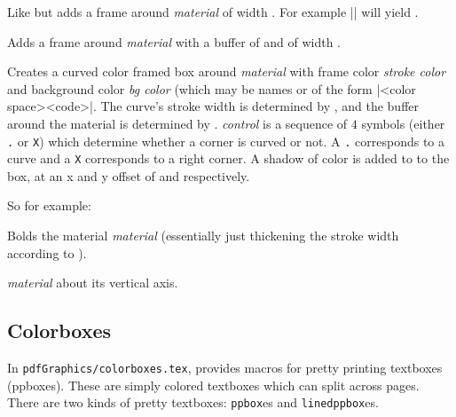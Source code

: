 Like \gotomacro{} but adds a frame around {\it material} of width \macro\framewidth.
For example \inlinecode|| will yield .
\emacroexp

Adds a frame around {\it material} with a buffer of \macro\bufferwidth{} and \macro\bufferheight{} of width \macro\framewidth.
\emacroexp

Creates a curved color framed box around {\it material} with frame color {\it stroke color} and background color {\it bg color} (which may be names or of the form \inlinecode|<color space>{<code>}|.
The curve's stroke width is determined by \macro\curvewidth, and the buffer around the material is determined by \macro\curvebuffer.
{\it control} is a sequence of $4$ symbols (either {\tt .} or {\tt X}) which determine whether a corner is curved or not.
A {\tt .} corresponds to a curve and a {\tt X} corresponds to a right corner.
A shadow of color \macro\boxshadowcolor{} is added to to the box, at an x and y offset of \macro\shadowxoff{} and \macro\shadowyoff{} respectively.

So for example:

\emacroexp

Bolds the material {\it material} (essentially just thickening the stroke width according to \macro\fakeboldwidth).
\emacroexp

\quitvmode{} {\it material} about its vertical axis.
\emacroexp

\subsection{Colorboxes}

In {\tt pdfGraphics/colorboxes.tex}, \pdftoolbox{} provides macros for pretty printing textboxes (ppboxes).
These are simply colored textboxes which can split across pages.
There are two kinds of pretty textboxes: {\tt ppbox}es and {\tt linedppbox}es.

